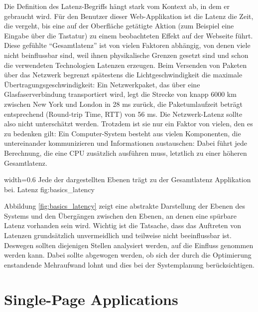 Die Definition des Latenz-Begriffs hängt stark vom Kontext ab, in dem er
gebraucht wird. Für den Benutzer dieser Web-Applikation ist die Latenz
die Zeit, die vergeht, bis eine auf der Oberfläche getätigte Aktion (zum
Beispiel eine Eingabe über die Tastatur) zu einem beobachteten Effekt
auf der Webseite führt. Diese gefühlte ``Gesamtlatenz'' ist von vielen
Faktoren abhängig, von denen viele nicht beinflussbar sind, weil ihnen
physikalische Grenzen gesetzt sind und schon die verwendeten Technologien
Latenzen erzeugen. Beim Versenden von Paketen über das
Netzwerk begrenzt spätestens die Lichtgeschwindigkeit die maximale
Übertragungsgeschwindigkeit: Ein Netzwerkpaket, das über eine
Glasfaserverbindung transportiert wird, legt die Strecke von knapp 6000
km zwischen New York und London in 28 ms zurück, die Paketumlaufzeit
beträgt entsprechend (Round-trip Time, RTT) von 56 ms. Die
Netzwerk-Latenz sollte also nicht unterschätzt werden. Trotzdem ist sie
nur ein Faktor von vielen, den es zu bedenken gilt: Ein Computer-System
besteht aus vielen Komponenten, die untereinander kommunizieren und
Informationen austauschen: Dabei führt jede Berechnung, die eine CPU
zusätzlich ausführen muss, letztlich zu einer höheren Gesamtlatenz.

   {width=0.6\textwidth}
   {Jede der dargestellten Ebenen trägt zu der Gesamtlatenz Applikation bei.}
   {Latenz}
   {fig:basics_latency}

Abbildung \ref{fig:basics_latency} zeigt eine abstrakte Darstellung der Ebenen des Systems
und den Übergängen zwischen den Ebenen, an denen eine spürbare Latenz
vorhanden sein wird. Wichtig ist die Tatsache, dass das Auftreten von
Latenzen grundsätzlich unvermeidlich und teilweise nicht beeinflussbar
ist. Deswegen sollten diejenigen Stellen analysiert werden, auf die
Einfluss genommen werden kann. Dabei sollte abgewogen werden, ob sich
der durch die Optimierung enstandende Mehraufwand lohnt und dies bei der
Systemplanung berücksichtigen.

\section{Single-Page Applications}\label{single-page-applications}

